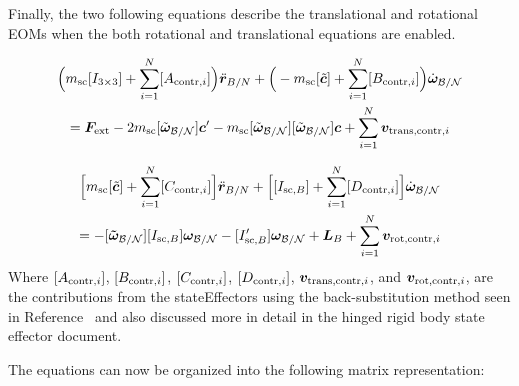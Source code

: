 Finally, the two following equations describe the translational and rotational EOMs when the both rotational and translational equations are enabled. 

\begin{multline}
\Big(m_{\text{sc}} [I_{3\times3}] +\sum_{i=1}^{N}[A_{\textnormal{contr},i}]\Big)\ddot{\bm r}_{B/N}+\Big(-m_{\text{sc}} [\tilde{\bm{c}}] +\sum_{i=1}^{N}[B_{\textnormal{contr},i}]\Big) \dot{\bm\omega}_{\cal B/N} \\
= \bm F_{\textnormal{ext}} 	- 2 m_{\text{sc}} [\tilde{\bm\omega}_{\cal B/N}] \bm c'
-m_{\text{sc}} [\tilde{\bm\omega}_{\cal B/N}][\tilde{\bm\omega}_{\cal B/N}]\bm{c}
+\sum_{i=1}^{N}\bm v_{\textnormal{trans,contr},i}
\label{eq:Rbddot8}
\end{multline}

\begin{multline}
\Big[m_{\text{sc}}[\tilde{\bm{c}}] +\sum\limits_{i=1}^{N}[C_{\textnormal{contr},i}]\Big]\ddot{\bm r}_{B/N}+\Big[[I_{\text{sc},B}]+\sum\limits_{i=1}^{N}[D_{\textnormal{contr},i}]\Big]\dot{\bm\omega}_{\cal B/N}
\\
= -[\bm{\tilde{\omega}}_{\cal B/N}] [I_{\text{sc},B}] \bm\omega_{\cal B/N} 
- [I'_{\text{sc},B}] \bm\omega_{\cal B/N} + \bm{L}_B +\sum\limits_{i=1}^{N}\bm v_{\textnormal{rot,contr},i}
\label{eq:Final9}
\end{multline}	
Where $[A_{\textnormal{contr},i}]$, $[B_{\textnormal{contr},i}]$, $[C_{\textnormal{contr},i}]$, $[D_{\textnormal{contr},i}]$, $\bm v_{\textnormal{trans,contr},i}$, and $\bm v_{\textnormal{rot,contr},i}$, are the contributions from the stateEffectors using the back-substitution method seen in Reference~\cite{Allard2016rz} and also discussed more in detail in the hinged rigid body state effector document.

The equations can now be organized into the following matrix representation:

